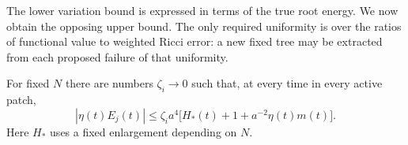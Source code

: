The lower variation bound is expressed in terms of the true root
energy. We now obtain the opposing upper bound. The only required
uniformity is over the ratios of functional value to weighted Ricci
error: a new fixed tree may be extracted from each proposed failure
of that uniformity.
\begin{proposition}
\label{final:functional-smallness}
For fixed $N$ there are numbers $\zeta_i\to0$ such that, at every
time in every active patch,
\begin{equation}\label{eq:functional-littleoh}
 |\eta(t)E_j(t)|\le
 \zeta_i a^4\bigl[H_*(t)+1+a^{-2}\eta(t)m(t)\bigr].
\end{equation}
Here $H_*$ uses a fixed enlargement depending on $N$.
\end{proposition}

